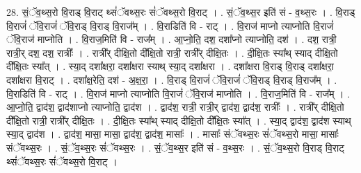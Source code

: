 \documentclass[17pt]{extarticle}
\begin{document}
28. सं॒ॅव॒थ्स॒रो वि॒राड् वि॒राट् थ्सं॑ॅवथ्स॒रः सं॑ॅवथ्स॒रो वि॒राट् । . सं॒ॅव॒थ्स॒र इति॑ सं - व॒थ्स॒रः । . वि॒राड् वि॒राजं॑ ॅवि॒राजं॑ ॅवि॒राड् वि॒राड् वि॒राज᳚म् । . वि॒राडिति॑ वि - राट् । . वि॒राज॑ माप्नो त्याप्नोति वि॒राजं॑ ॅवि॒राज॑ माप्नोति । . वि॒राज॒मिति॑ वि - राज᳚म् । . आ॒प्नो॒ति॒ दश॒ दशा᳚प्नो त्याप्नोति॒ दश॑ । . दश॒ रात्री॒ रात्री॒र् दश॒ दश॒ रात्रीः᳚ । . रात्री᳚र् दीक्षि॒तो दी᳚क्षि॒तो रात्री॒ रात्री᳚र् दीक्षि॒तः । . दी॒क्षि॒तः स्या᳚थ् स्याद् दीक्षि॒तो दी᳚क्षि॒तः स्या᳚त् । . स्या॒द् दशा᳚क्षरा॒ दशा᳚क्षरा स्याथ् स्या॒द् दशा᳚क्षरा । . दशा᳚क्षरा वि॒राड् वि॒राड् दशा᳚क्षरा॒ दशा᳚क्षरा वि॒राट् । . दशा᳚क्ष॒रेति॒ दश॑ - अ॒क्ष॒रा॒ । . वि॒राड् वि॒राजं॑ ॅवि॒राजं॑ ॅवि॒राड् वि॒राड् वि॒राज᳚म् । . वि॒राडिति॑ वि - राट् । . वि॒राज॑ माप्नो त्याप्नोति वि॒राजं॑ ॅवि॒राज॑ माप्नोति । . वि॒राज॒मिति॑ वि - राज᳚म् । . आ॒प्नो॒ति॒ द्वाद॑श॒ द्वाद॑शाप्नो त्याप्नोति॒ द्वाद॑श । . द्वाद॑श॒ रात्री॒ रात्री॒र् द्वाद॑श॒ द्वाद॑श॒ रात्रीः᳚ । . रात्री᳚र् दीक्षि॒तो दी᳚क्षि॒तो रात्री॒ रात्री᳚र् दीक्षि॒तः । . दी॒क्षि॒तः स्या᳚थ् स्याद् दीक्षि॒तो दी᳚क्षि॒तः स्या᳚त् । . स्या॒द् द्वाद॑श॒ द्वाद॑श स्याथ् स्या॒द् द्वाद॑श । . द्वाद॑श॒ मासा॒ मासा॒ द्वाद॑श॒ द्वाद॑श॒ मासाः᳚ । . मासाः᳚ संॅवथ्स॒रः सं॑ॅवथ्स॒रो मासा॒ मासाः᳚ संॅवथ्स॒रः । . सं॒ॅव॒थ्स॒रः सं॑ॅवथ्स॒रः । . सं॒ॅव॒थ्स॒र इति॑ सं - व॒थ्स॒रः । . सं॒ॅव॒थ्स॒रो वि॒राड् वि॒राट् थ्सं॑ॅवथ्स॒रः सं॑ॅवथ्स॒रो वि॒राट् । \newline
\end{document}
